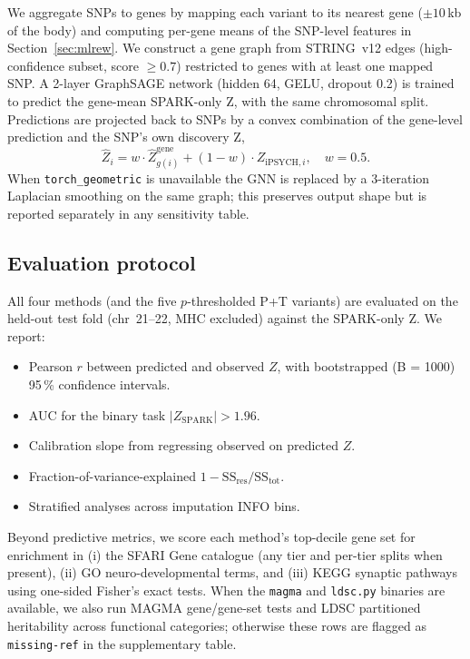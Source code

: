 We aggregate SNPs to genes by mapping each variant to its nearest gene
($\pm 10$\,kb of the body) and computing per-gene means of the
SNP-level features in Section~\ref{sec:mlrew}. We construct a gene
graph from STRING~v12 edges (high-confidence subset, score
$\geq 0.7$) restricted to genes with at least one mapped SNP. A 2-layer
GraphSAGE network (hidden 64, GELU, dropout 0.2) is trained to predict
the gene-mean SPARK-only Z, with the same chromosomal split. Predictions
are projected back to SNPs by a convex combination of the gene-level
prediction and the SNP's own discovery Z,
\begin{equation}
  \hat{Z}_i = w \cdot \hat{Z}^{\mathrm{gene}}_{g(i)}
              + (1 - w) \cdot Z_{\mathrm{iPSYCH},i},
  \quad w = 0.5.
\end{equation}
When \texttt{torch\_geometric} is unavailable the GNN is replaced by a
3-iteration Laplacian smoothing on the same graph; this preserves
output shape but is reported separately in any sensitivity table.

\subsection{Evaluation protocol}

All four methods (and the five $p$-thresholded P+T variants) are
evaluated on the held-out test fold (chr~21--22, MHC excluded) against
the SPARK-only Z. We report:
\begin{itemize}[nosep,leftmargin=1.2em]
  \item Pearson $r$ between predicted and observed $Z$, with
        bootstrapped (B = 1000) 95\,\% confidence intervals.
  \item AUC for the binary task $|Z_{\mathrm{SPARK}}| > 1.96$.
  \item Calibration slope from regressing observed on predicted $Z$.
  \item Fraction-of-variance-explained
        $1 - \mathrm{SS}_{\mathrm{res}}/\mathrm{SS}_{\mathrm{tot}}$.
  \item Stratified analyses across imputation INFO bins.
\end{itemize}
Beyond predictive metrics, we score each method's top-decile gene set
for enrichment in (i) the SFARI Gene catalogue (any tier and per-tier
splits when present), (ii) GO neuro-developmental terms, and (iii) KEGG
synaptic pathways using one-sided Fisher's exact tests. When the
\texttt{magma} and \texttt{ldsc.py} binaries are available, we also run
MAGMA gene/gene-set tests and LDSC partitioned heritability across
functional categories; otherwise these rows are flagged as
\texttt{missing-ref} in the supplementary table.
